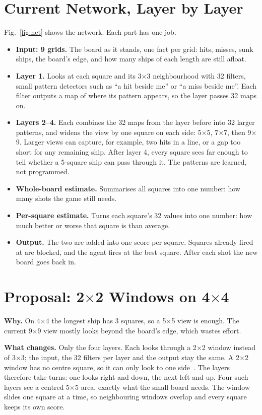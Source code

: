 \documentclass[conference,10pt]{IEEEtran}
\begin{document}
\section{Current Network, Layer by Layer}
Fig.~\ref{fig:net} shows the network. Each part has one job.
\begin{itemize}
\item \textbf{Input: 9 grids.} The board as it stands, one fact per grid: hits,
misses, sunk ships, the board's edge, and how many ships of each length are
still afloat.
\item \textbf{Layer 1.} Looks at each square and its 3$\times$3 neighbourhood
with 32 filters, small pattern detectors such as ``a hit beside me'' or ``a
miss beside me''. Each filter outputs a map of where its pattern appears, so the
layer passes 32 maps on.
\item \textbf{Layers 2--4.} Each combines the 32 maps from the layer before into
32 larger patterns, and widens the view by one square on each side: 5$\times$5,
7$\times$7, then 9$\times$9. Larger views can capture, for example, two hits in
a line, or a gap too short for any remaining ship. After layer 4, every square
sees far enough to tell whether a 5-square ship can pass through it. The
patterns are learned, not programmed.
\item \textbf{Whole-board estimate.} Summarises all squares into one number:
how many shots the game still needs.
\item \textbf{Per-square estimate.} Turns each square's 32 values into one
number: how much better or worse that square is than average.
\item \textbf{Output.} The two are added into one score per square. Squares
already fired at are blocked, and the agent fires at the best square. After
each shot the new board goes back in.
\end{itemize}

\section{Proposal: 2$\times$2 Windows on 4$\times$4}
\textbf{Why.} On 4$\times$4 the longest ship has 3 squares, so a 5$\times$5
view is enough. The current 9$\times$9 view mostly looks beyond the board's
edge, which wastes effort.

\textbf{What changes.} Only the four layers. Each looks through a 2$\times$2
window instead of 3$\times$3; the input, the 32 filters per layer and the
output stay the same. A 2$\times$2 window has no centre square, so it can only
look to one side~\cite{evenkernel}. The layers therefore take turns: one looks
right and down, the next left and up. Four such layers see a centred 5$\times$5
area, exactly what the small board needs. The window slides one square at a
time, so neighbouring windows overlap and every square keeps its own score.
\end{document}
